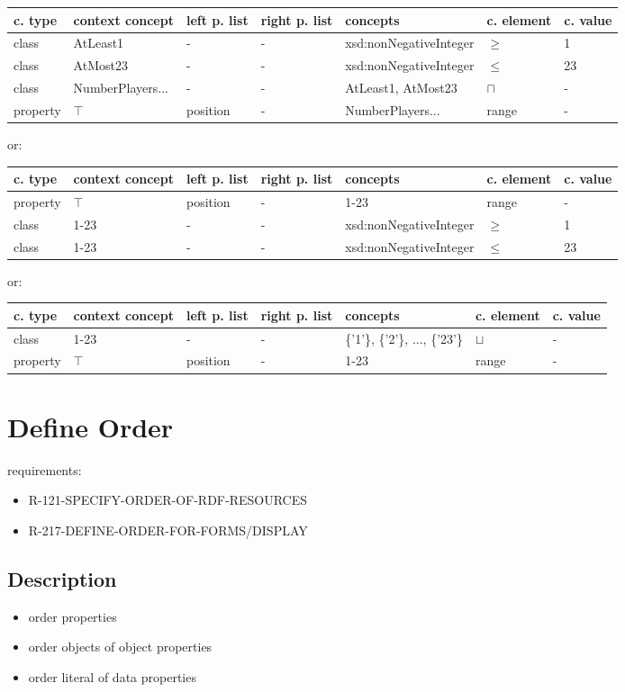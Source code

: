 \documentclass{llncs}
\newenvironment{gcotable}{
  \scriptsize
  \sffamily
  \vspace{0.3cm}
  \begin{tabular}{l|l|l|l|l|l|l}
  \hline
  \textbf{c. type} & \textbf{context concept} & \textbf{left p. list} & \textbf{right p. list} & \textbf{concepts} & \textbf{c. element} & \textbf{c. value} \\
  \hline

}{
  \hline
  \end{tabular}
  \linebreak
}
\begin{document}
\begin{gcotable}
class & AtLeast1 & - & - & xsd:nonNegativeInteger & $\geq$ & 1 \\
class & AtMost23 & - & - & xsd:nonNegativeInteger & $\leq$ & 23 \\
class & NumberPlayers... & - & - & AtLeast1, AtMost23 & $\sqcap$ & - \\
property & $\top$ & position & - & NumberPlayers... & range & - \\
\end{gcotable}

or:

\begin{gcotable}
property & $\top$ & position & - & 1-23 & range & - \\
class & 1-23 & - & - & xsd:nonNegativeInteger & $\geq$ & 1 \\
class & 1-23 & - & - & xsd:nonNegativeInteger & $\leq$ & 23 \\
\end{gcotable}

or:

\begin{gcotable}
class & 1-23 & - & - & \{'1'\}, \{'2'\}, ..., \{'23'\} & $\sqcup$ & - \\
property & $\top$ & position & - & 1-23 & range& - \\
\end{gcotable}

\section{Define Order}

requirements:

\begin{itemize}
  \item R-121-SPECIFY-ORDER-OF-RDF-RESOURCES
	\item R-217-DEFINE-ORDER-FOR-FORMS/DISPLAY
\end{itemize}

\subsection{Description}

\begin{itemize}
	\item order properties
	\item order objects of object properties
	\item order literal of data properties
\end{itemize}
\end{document}

